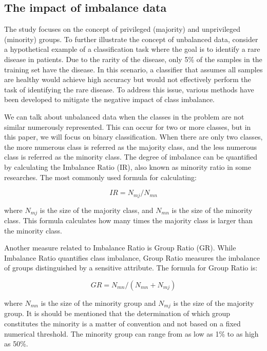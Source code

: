 \documentclass[sn-vancouver]{sn-jnl}%
\theoremstyle{thmstyleone}%
\theoremstyle{thmstyletwo}%
\theoremstyle{thmstylethree}%
\begin{document}
\subsection{The impact of imbalance data}\label{subsec1}

The study focuses on the concept of privileged (majority) and unprivileged (minority) groups. To further illustrate the concept of unbalanced data, consider a hypothetical example of a classification task where the goal is to identify a rare disease in patients. Due to the rarity of the disease, only 5\% of the samples in the training set have the disease. In this scenario, a classifier that assumes all samples are healthy would achieve high accuracy but would not effectively perform the task of identifying the rare disease. To address this issue, various methods have been developed to mitigate the negative impact of class imbalance.

We can talk about unbalanced data when the classes in the problem are not similar numerously represented. This can occur for two or more classes, but in this paper, we will focus on binary classification. When there are only two classes, the more numerous class is referred as the majority class, and the less numerous class is referred as the minority class. The degree of imbalance can be quantified by calculating the Imbalance Ratio (IR), also known as minority ratio in some researches. The most commonly used formula for calculating:

\begin{equation}
IR = N_{mj} / N_{mn}\label{eq1}
\end{equation}

where $N_{mj}$ is the size of the majority class, and $N_{mn}$ is the size of the minority class. This formula calculates how many times the majority class is larger than the minority class.

Another measure related to Imbalance Ratio is Group Ratio (GR). While Imbalance Ratio quantifies class imbalance, Group Ratio measures the imbalance of groups distinguished by a sensitive attribute. The formula for Group Ratio is:

\begin{equation}
GR = N_{mn}  / (N_{mn} + N_{mj}) \label{eq2}
\end{equation}

where $N_{mn}$ is the size of the minority group and $N_{mj}$ is the size of the majority group. It is should be mentioned that the determination of which group constitutes the minority is a matter of convention and not based on a fixed numerical threshold. The minority group can range from as low as 1\% to as high as 50\%.
\end{document}
